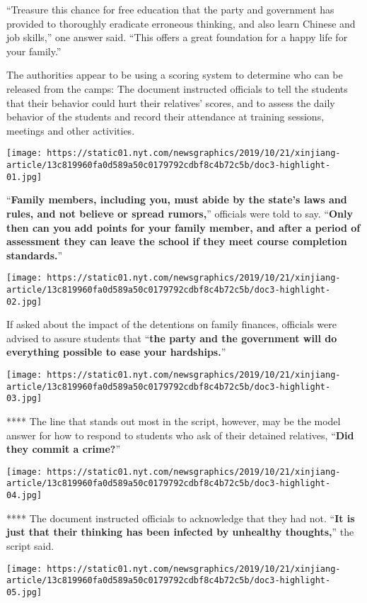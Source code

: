 ``Treasure this chance for free education that the party and government
has provided to thoroughly eradicate erroneous thinking, and also learn
Chinese and job skills,'' one answer said. ``This offers a great
foundation for a happy life for your family.''

The authorities appear to be using a scoring system to determine who can
be released from the camps: The document instructed officials to tell
the students that their behavior could hurt their relatives' scores, and
to assess the daily behavior of the students and record their attendance
at training sessions, meetings and other activities.

\texttt{[image: https://static01.nyt.com/newsgraphics/2019/10/21/xinjiang-article/13c819960fa0d589a50c0179792cdbf8c4b72c5b/doc3-highlight-01.jpg]}

``\textbf{Family members, including you, must abide by the state's laws
and rules, and not believe or spread rumors,}'' officials were told to
say. ``\textbf{Only then can you add points for your family member, and
after a period of assessment they can leave the school if they meet
course completion standards.}''

\texttt{[image: https://static01.nyt.com/newsgraphics/2019/10/21/xinjiang-article/13c819960fa0d589a50c0179792cdbf8c4b72c5b/doc3-highlight-02.jpg]}

If asked about the impact of the detentions on family finances,
officials were advised to assure students that ``\textbf{the party and
the government will do everything possible to ease your hardships.}''

\texttt{[image: https://static01.nyt.com/newsgraphics/2019/10/21/xinjiang-article/13c819960fa0d589a50c0179792cdbf8c4b72c5b/doc3-highlight-03.jpg]}

 **** The line that stands out most in the script, however, may be the
model answer for how to respond to students who ask of their detained
relatives, ``\textbf{Did they commit a crime?}''

\texttt{[image: https://static01.nyt.com/newsgraphics/2019/10/21/xinjiang-article/13c819960fa0d589a50c0179792cdbf8c4b72c5b/doc3-highlight-04.jpg]}

 **** The document instructed officials to acknowledge that they had
not. ``\textbf{It is just that their thinking has been infected by
unhealthy thoughts,}'' the script said.

\texttt{[image: https://static01.nyt.com/newsgraphics/2019/10/21/xinjiang-article/13c819960fa0d589a50c0179792cdbf8c4b72c5b/doc3-highlight-05.jpg]}

